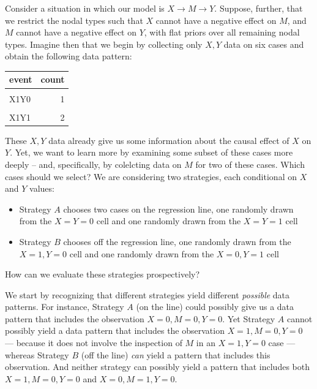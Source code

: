 \documentclass[
  12pt,
]{book}
\providecommand{\tightlist}{%
  \setlength{\itemsep}{0pt}\setlength{\parskip}{0pt}}
\begin{document}
Consider a situation in which our model is \(X \rightarrow M \rightarrow Y\). Suppose, further, that we restrict the nodal types such that \(X\) cannot have a negative effect on \(M\), and \(M\) cannot have a negative effect on \(Y\), with flat priors over all remaining nodal types. Imagine then that we begin by collecting only \(X,Y\) data on six cases and obtain the following data pattern:

\begin{table}
\centering
\begin{tabular}{lr}
\toprule
event & count\\
\midrule
\cellcolor{gray!6}{X0Y0} & \cellcolor{gray!6}{2}\\
X1Y0 & 1\\
\cellcolor{gray!6}{X0Y1} & \cellcolor{gray!6}{1}\\
X1Y1 & 2\\
\bottomrule
\end{tabular}
\end{table}

These \(X,Y\) data already give us some information about the causal effect of \(X\) on \(Y\). Yet, we want to learn more by examining some subset of these cases more deeply -- and, specifically, by colelcting data on \(M\) for two of these cases. Which cases should we select? We are considering two strategies, each conditional on \(X\) and \(Y\) values:

\begin{itemize}
\tightlist
\item
  Strategy \(A\) chooses two cases on the regression line, one randomly drawn from the \(X=Y=0\) cell and one randomly drawn from the \(X=Y=1\) cell
\item
  Strategy \(B\) chooses off the regression line, one randomly drawn from the \(X=1, Y=0\) cell and one randomly drawn from the \(X=0, Y=1\) cell
\end{itemize}

How can we evaluate these strategies prospectively?

We start by recognizing that different strategies yield different \emph{possible} data patterns. For instance, Strategy \(A\) (on the line) could possibly give us a data pattern that includes the observation \(X=0, M=0, Y=0\). Yet Strategy \(A\) cannot possibly yield a data pattern that includes the observation \(X=1, M=0, Y=0\) --- because it does not involve the inspection of \(M\) in an \(X=1, Y=0\) case --- whereas Strategy \(B\) (off the line) \emph{can} yield a pattern that includes this observation. And neither strategy can possibly yield a pattern that includes both \(X=1, M=0, Y=0\) and \(X=0, M=1, Y=0\).
\end{document}
